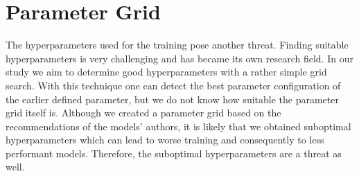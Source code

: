 \section{Parameter Grid}
\label{chp:threats_to_validity:sec:parameter_grid}

The hyperparameters used for the training pose another threat.
Finding suitable hyperparameters is very challenging \parencite{Zeiler:2012} and has became its own research field.
In our study we aim to determine good hyperparameters with a rather simple grid search.
With this technique one can detect the best parameter configuration of the earlier defined parameter, but we do not know how suitable the parameter grid itself is.
Although we created a parameter grid based on the recommendations of the models' authors, it is likely that we obtained suboptimal hyperparameters which can lead to worse training and consequently to less performant models.
Therefore, the suboptimal hyperparameters are a threat as well.
